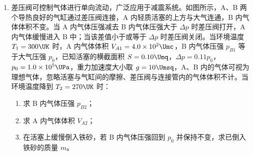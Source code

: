 \documentclass[\gkver]{gaokaozhenti}
\begin{document}
\begin{enumerate}
\item
差压阀可控制气体进行单向流动，广泛应用于减震系统。如图所示，A、B 两个导热良好的气缸通过差压阀连接，A 内轻质活塞的上方与大气连通，B 内气体体积不变。当 A 内气体压强减去 B 内气体压强大于 $\Delta p$ 时差压阀打开，A 内气体缓慢进入 B 中；当该差值小于或等于 $\Delta p$ 时差压阀关闭。当环境温度 $T_{1} = 300 \UK$ 时，A 内气体体积 $V_{A1} = 4.0 \times 10^{2} \Umc$，B 内气体压强 $p_{B1}$ 等于大气压强 $p_{0}$，已知活塞的横截面积 $S = 0.10 \Umq$，$\Delta p = 0.11p_{0}$，$p_{0} = 1.0 \times 10^{5} \UPa$，重力加速度大小取 $g = 10 \Umsq$，A、B 内的气体可视为理想气体，忽略活塞与气缸间的摩擦、差压阀与连接管内的气体体积不计。当环境温度降到 $T_{2} = 270 \UK$ 时：
\begin{enumerate}
	\item
	求 B 内气体压强 $p_{B2}$；
	\item
	求 A 内气体体积 $V_{A2}$；
	\item
	在活塞上缓慢倒入铁砂，若 B 内气体压强回到 $p_{0}$ 并保持不变，求已倒入铁砂的质量 $m$。
\end{enumerate}
\end{enumerate}
\end{document}
